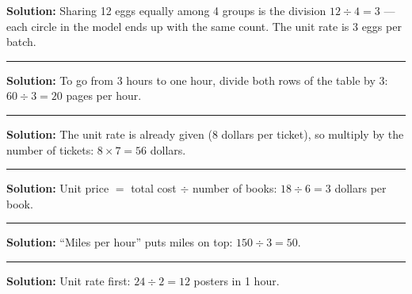 \documentclass[12pt]{article}
\begin{document}



\textbf{Solution:} Sharing 12 eggs equally among 4 groups is the division
$12 \div 4 = 3$ — each circle in the model ends up with the same count. The unit
rate is 3 eggs per batch. 

\vspace{0.3cm}\noindent\rule{\linewidth}{0.2pt}\vspace{0.3cm}


\textbf{Solution:} To go from 3 hours to one hour, divide both rows of the table
by 3: $60 \div 3 = 20$ pages per hour. 

\vspace{0.3cm}\noindent\rule{\linewidth}{0.2pt}\vspace{0.3cm}


\textbf{Solution:} The unit rate is already given (8 dollars per ticket), so
multiply by the number of tickets: $8 \times 7 = 56$ dollars. 

\vspace{0.3cm}\noindent\rule{\linewidth}{0.2pt}\vspace{0.3cm}


\textbf{Solution:} Unit price $=$ total cost $\div$ number of books:
$18 \div 6 = 3$ dollars per book. 

\vspace{0.3cm}\noindent\rule{\linewidth}{0.2pt}\vspace{0.3cm}


\textbf{Solution:} ``Miles per hour'' puts miles on top: $150 \div 3 = 50$.

\vspace{0.3cm}\noindent\rule{\linewidth}{0.2pt}\vspace{0.3cm}


\textbf{Solution:} Unit rate first: $24 \div 2 = 12$ posters in 1 hour. 
\end{document}
